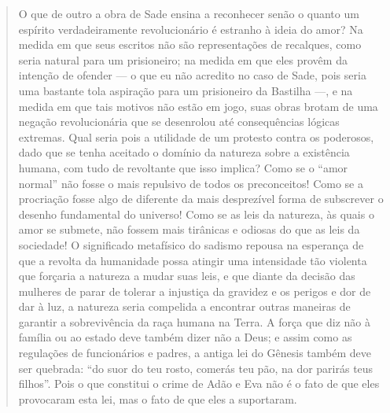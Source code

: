 \begin{quote} 
O que de outro a obra de Sade ensina a reconhecer senão o quanto um espírito verdadeiramente revolucionário é estranho à ideia do amor? Na medida em que seus escritos não são representações de recalques, como seria natural para um prisioneiro; na medida em que eles provêm da intenção de ofender --- o que eu não acredito no caso de Sade, pois seria uma bastante tola aspiração para um prisioneiro da Bastilha ---, e na medida em que tais motivos não estão em jogo, suas obras brotam de uma negação revolucionária que se desenrolou até consequências lógicas extremas. Qual seria pois a utilidade de um protesto contra os poderosos, dado que se tenha aceitado o domínio da natureza sobre a existência humana, com tudo de revoltante que isso implica? Como se o ``amor normal'' não fosse o mais repulsivo de todos os preconceitos! Como se a procriação fosse algo de diferente da mais desprezível forma de subscrever o desenho fundamental do universo! Como se as leis da natureza, às quais o amor se submete, não fossem mais tirânicas e odiosas do que as leis da sociedade! O significado metafísico do sadismo repousa na esperança de que a revolta da humanidade possa atingir uma intensidade tão violenta que forçaria a natureza a mudar suas leis, e que diante da decisão das mulheres de parar de tolerar a injustiça da gravidez e os perigos e dor de dar à luz, a natureza seria compelida a encontrar outras maneiras de garantir a sobrevivência da raça humana na Terra. A força que diz não à família ou ao estado deve também dizer não a Deus; e assim como as regulações de funcionários e padres, a antiga lei do Gênesis também deve ser quebrada: ``do suor do teu rosto, comerás teu pão, na dor parirás teus filhos''. Pois o que constitui o crime de Adão e Eva não é o fato de que eles provocaram esta lei, mas o fato de que eles a suportaram. 
\end{quote}

